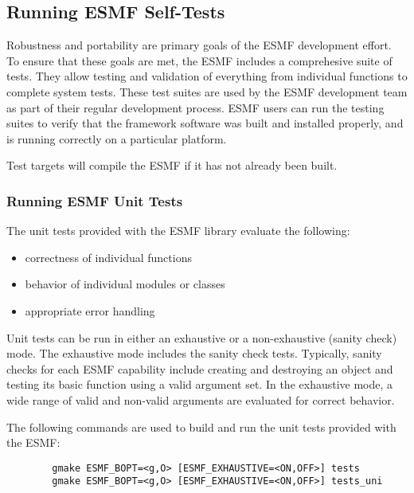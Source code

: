 
\subsection{Running ESMF Self-Tests}
\label{testing}

Robustness and portability are primary goals of the ESMF development
effort.  To ensure that these goals are met, the ESMF includes a
comprehesive suite of tests.  They allow testing and validation of
everything from individual functions to complete system tests.  These
test suites are used by the ESMF development team as part of their
regular development process.  ESMF users can run the testing suites to
verify that the framework software was built and installed properly,
and is running correctly on a particular platform.

Test targets will compile the ESMF if it has not already been built.

\subsubsection{Running ESMF Unit Tests}

\label{UnitTestDescription}
The unit tests provided with the ESMF library evaluate the following:
\begin{itemize}
\item correctness of individual functions
\item behavior of individual modules or classes
\item appropriate error handling
\end{itemize}

Unit tests can be run in either an exhaustive or a non-exhaustive (sanity check)
mode.  The exhaustive mode includes the sanity check tests.  Typically, sanity
checks for each ESMF capability include creating and destroying an object and 
testing its basic function using a valid argument set.  In the exhaustive mode,
a wide range of valid and non-valid arguments are evaluated for correct behavior.

\label{RunUnitTests}

The following commands are used to build and run the unit tests provided with 
the ESMF:
\begin{verbatim}
        gmake ESMF_BOPT=<g,O> [ESMF_EXHAUSTIVE=<ON,OFF>] tests
        gmake ESMF_BOPT=<g,O> [ESMF_EXHAUSTIVE=<ON,OFF>] tests_uni
\end{verbatim}


